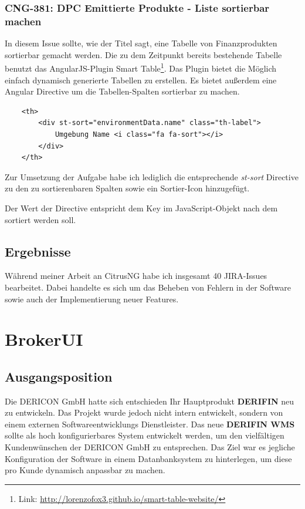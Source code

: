\documentclass[chapterprefix=false, 12pt, a4paper, oneside, parskip=half, listof=totoc, bibliography=totoc, numbers=noendperiod]{scrbook}
\begin{document}
    \subsubsection{CNG-381: DPC Emittierte Produkte - Liste sortierbar machen}

    In diesem Issue sollte, wie der Titel sagt, eine Tabelle von Finanzprodukten sortierbar gemacht werden.
    Die zu dem Zeitpunkt bereits bestehende Tabelle benutzt das AngularJS-Plugin Smart Table\footnote{Link: \url{http://lorenzofox3.github.io/smart-table-website/}}.
    Das Plugin bietet die Möglich einfach dynamisch generierte Tabellen zu erstellen. Es bietet außerdem eine Angular Directive um die Tabellen-Spalten sortierbar zu machen.

    \begin{verbatim}
    <th>
        <div st-sort="environmentData.name" class="th-label">
            Umgebung Name <i class="fa fa-sort"></i>
        </div>
    </th>
    \end{verbatim}

    Zur Umsetzung der Aufgabe habe ich lediglich die entsprechende \textit{st-sort} Directive zu den zu sortierenbaren
    Spalten sowie ein Sortier-Icon hinzugefügt.

    \pagebreak

    Der Wert der Directive entspricht dem Key im JavaScript-Objekt nach dem
    sortiert werden soll.

    \subsection{Ergebnisse}

    Während meiner Arbeit an CitrusNG habe ich insgesamt 40 JIRA-Issues bearbeitet. Dabei handelte
    es sich um das Beheben von Fehlern in der Software sowie auch der Implementierung neuer Features.

    \section{BrokerUI}

    \subsection{Ausgangsposition}

    Die DERICON GmbH hatte sich entschieden Ihr Hauptprodukt \textbf{DERIFIN} neu zu entwickeln.
    Das Projekt wurde jedoch nicht intern entwickelt, sondern von einem externen Softwareentwicklungs Dienstleister.
    Das neue \textbf{DERIFIN WMS} sollte als hoch konfigurierbares System entwickelt werden, um den vielfältigen
    Kundenwünschen der DERICON GmbH zu entsprechen. Das Ziel war es jegliche Konfiguration der Software in einem
    Datanbanksystem zu hinterlegen, um diese pro Kunde dynamisch anpassbar zu machen.
\end{document}
